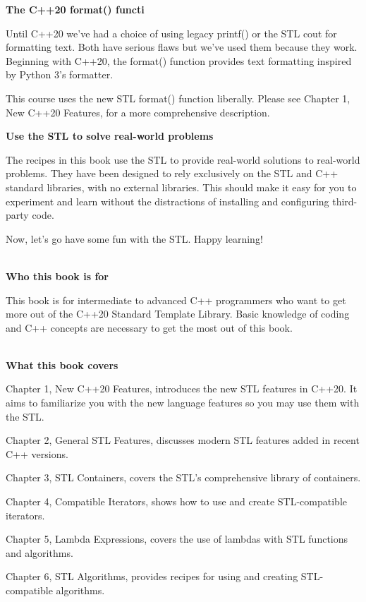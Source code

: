 \noindent
\textbf{The C++20 format() functi}

Until C++20 we've had a choice of using legacy printf() or the STL cout for formatting text. Both have serious flaws but we've used them because they work. Beginning with C++20, the format() function provides text formatting inspired by Python 3's formatter.

This course uses the new STL format() function liberally. Please see Chapter 1, New C++20 Features, for a more comprehensive description.

\noindent
\textbf{Use the STL to solve real-world problems }

The recipes in this book use the STL to provide real-world solutions to real-world problems. They have been designed to rely exclusively on the STL and C++ standard libraries, with no external libraries. This should make it easy for you to experiment and learn without the distractions of installing and configuring third-party code.

Now, let's go have some fun with the STL. Happy learning!

\hspace*{\fill} \\ %
\noindent
\textbf{Who this book is for}

This book is for intermediate to advanced C++ programmers who want to get more out of the C++20 Standard Template Library. Basic knowledge of coding and C++ concepts are necessary to get the most out of this book.

\hspace*{\fill} \\ %
\noindent
\textbf{What this book covers}

Chapter 1, New C++20 Features, introduces the new STL features in C++20. It aims to familiarize you with the new language features so you may use them with the STL.

Chapter 2, General STL Features, discusses modern STL features added in recent C++ versions.

Chapter 3, STL Containers, covers the STL's comprehensive library of containers.

Chapter 4, Compatible Iterators, shows how to use and create STL-compatible iterators.

Chapter 5, Lambda Expressions, covers the use of lambdas with STL functions and algorithms.

Chapter 6, STL Algorithms, provides recipes for using and creating STL-compatible algorithms.

